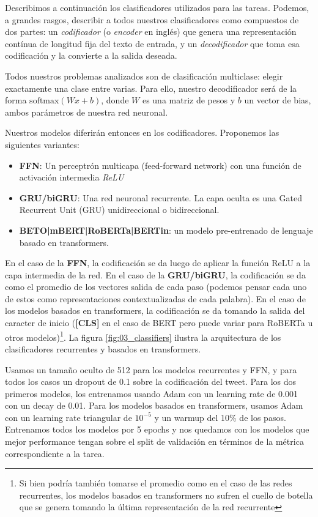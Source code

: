 Describimos a continuación los clasificadores utilizados para las tareas. Podemos, a grandes rasgos, describir a todos nuestros clasificadores como compuestos de dos partes: un \emph{codificador} (o \emph{encoder} en inglés) que genera una representación contínua de longitud fija del texto de entrada, y un \emph{decodificador} que toma esa codificación y la convierte a la salida deseada.

Todos nuestros problemas analizados son de clasificación multiclase: elegir exactamente una clase entre varias. Para ello, nuestro decodificador será de la forma $\text{softmax}(Wx + b)$, donde $W$ es una matriz de pesos y $b$ un vector de bias, ambos parámetros de nuestra red neuronal.

Nuestros modelos diferirán entonces en los codificadores. Proponemos las siguientes variantes:

\begin{itemize}
    \item \textbf{FFN}: Un perceptrón multicapa (feed-forward network) con una función de activación intermedia \emph{ReLU}
    \item \textbf{GRU/biGRU}: Una red neuronal recurrente. La capa oculta es una Gated Recurrent Unit (GRU) unidireccional o bidireccional.
    \item \textbf{BETO|mBERT|RoBERTa|BERTin}: un modelo pre-entrenado de lenguaje basado en transformers.
\end{itemize}

En el caso de la \textbf{FFN}, la codificación se da luego de aplicar la función ReLU a la capa intermedia de la red. En el caso de la \textbf{GRU/biGRU}, la codificación se da como el promedio de los vectores salida de cada paso (podemos pensar cada uno de estos como representaciones contextualizadas de cada palabra). En el caso de los modelos basados en transformers, la codificación se da tomando la salida del caracter de inicio (\textbf{[CLS]} en el caso de BERT pero puede variar para RoBERTa u otros modelos)\footnote{Si bien podría también tomarse el promedio como en el caso de las redes recurrentes, los modelos basados en transformers no sufren el cuello de botella que se genera tomando la última representación de la red recurrente}. La figura \ref{fig:03_classifiers} ilustra la arquitectura de los clasificadores recurrentes y basados en transformers.

Usamos un tamaño oculto de 512 para los modelos recurrentes y FFN, y para todos los casos un dropout \cite{srivastava2014dropout} de 0.1 sobre la codificación del tweet. Para los dos primeros modelos, los entrenamos usando Adam con un learning rate de 0.001 con un decay de 0.01. Para los modelos basados en transformers, usamos Adam con un learning rate triangular de $10^{-5}$ y un warmup del 10\% de los pasos. Entrenamos todos los modelos por 5 epochs y nos quedamos con los modelos que mejor performance tengan sobre el split de validación en términos de la métrica correspondiente a la tarea.

